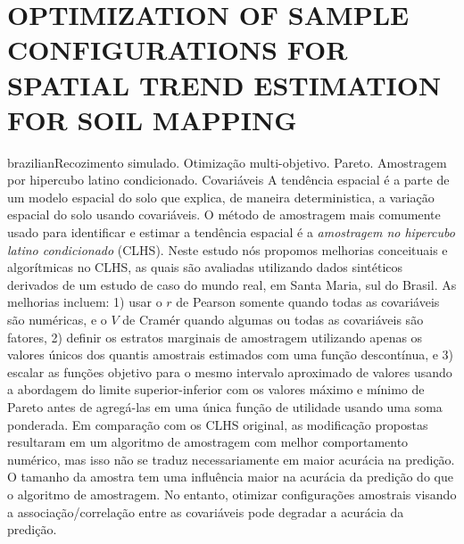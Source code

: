 \artigotrue
\chapter{OPTIMIZATION OF SAMPLE CONFIGURATIONS FOR SPATIAL TREND ESTIMATION FOR SOIL MAPPING}
\label{chap:chap08}

\def\ptkeys{Recozimento simulado. Otimização multi-objetivo. Pareto. Amostragem por hipercubo latino 
condicionado. Covariáveis}

\begin{chapterabstract}{brazilian}{\ptkeys}
A tendência espacial é a parte de um modelo espacial do solo que explica, de maneira deterministica, a 
variação espacial do solo usando covariáveis. O método de amostragem mais comumente usado para identificar e 
estimar a tendência espacial é a \emph{amostragem no hipercubo latino condicionado} (CLHS). Neste estudo nós 
propomos melhorias conceituais e algorítmicas no CLHS, as quais são avaliadas utilizando dados sintéticos 
derivados de um estudo de caso do mundo real, em Santa Maria, sul do Brasil. As melhorias incluem: 1) usar o 
$r$ de Pearson somente quando todas as covariáveis são numéricas, e o $V$ de Cramér quando algumas ou todas as 
covariáveis são fatores, 2) definir os estratos marginais de amostragem utilizando apenas os valores únicos 
dos quantis amostrais estimados com uma função descontínua, e 3) escalar as funções objetivo para o mesmo 
intervalo aproximado de valores usando a abordagem do limite superior-inferior com os valores máximo e mínimo 
de Pareto antes de agregá-las em uma única função de utilidade usando uma soma ponderada. Em comparação com os 
CLHS original, as modificação propostas resultaram em um algoritmo de amostragem com melhor comportamento 
numérico, mas isso não se traduz necessariamente em maior acurácia na predição. O tamanho da amostra tem uma 
influência maior na acurácia da predição do que o algoritmo de amostragem. No entanto, otimizar configurações 
amostrais visando a associação/correlação entre as covariáveis pode degradar a acurácia da predição.
\end{chapterabstract}

